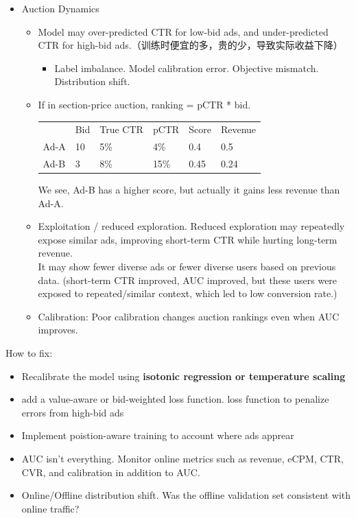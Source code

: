 \begin{itemize}
    \item Auction Dynamics
    \begin{itemize}
        \item Model may over-predicted CTR for low-bid ads, and under-predicted CTR for high-bid ads.（训练时便宜的多，贵的少，导致实际收益下降）
        \begin{itemize}
            \item Label imbalance. Model calibration error. Objective mismatch. Distribution shift.
        \end{itemize}
        \item If in section-price auction, ranking = pCTR * bid. \\
        \begin{table}[H]
        \begin{tabular}{llllll}
            & Bid & True CTR & pCTR & Score & Revenue\\
        Ad-A & 10   & 5\%      & 4\%  & 0.4   & 0.5\\
        Ad-B & 3   & 8\%      & 15\%  & 0.45  & 0.24
        \end{tabular}
        \end{table}
        We see, Ad-B has a higher score, but actually it gains less revenue than Ad-A.
        \item Exploitation / reduced exploration. Reduced exploration may repeatedly expose similar ads, improving short-term CTR while hurting long-term revenue.\\
         It may show fewer diverse ads or fewer diverse users based on previous data. (short-term CTR improved, AUC improved, but these users were exposed to repeated/similar context, which led to low conversion rate.)
        \item Calibration: Poor calibration changes auction rankings even when AUC improves.
    \end{itemize}
\end{itemize}

How to fix:
\begin{itemize}
    \item Recalibrate the model using \textbf{isotonic regression or temperature scaling}
    \item add a value-aware or bid-weighted loss function. loss function to penalize errors from high-bid ads
    \item Implement poistion-aware training to account where ads apprear
    \item AUC isn't everything. Monitor online metrics such as revenue, eCPM, CTR, CVR, and calibration in addition to AUC.
    \item Online/Offline distribution shift. Was the offline validation set consistent with online traffic?
\end{itemize}



